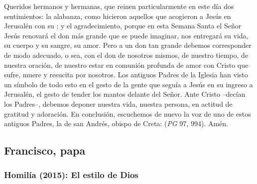 \begin{body}
Queridos hermanos y hermanas, que reinen particularmente en este día dos sentimientos: la alabanza, como hicieron aquellos que acogieron a Jesús en Jerusalén con su ; y el agradecimiento, porque en esta Semana Santa el Señor Jesús renovará el don más grande que se puede imaginar, nos entregará su vida, su cuerpo y su sangre, su amor. Pero a un don tan grande debemos corresponder de modo adecuado, o sea, con el don de nosotros mismos, de nuestro tiempo, de nuestra oración, de nuestro estar en comunión profunda de amor con Cristo que sufre, muere y resucita por nosotros. Los antiguos Padres de la Iglesia han visto un símbolo de todo esto en el gesto de la gente que seguía a Jesús en su ingreso a Jerusalén, el gesto de tender los mantos delante del Señor. Ante Cristo –decían los Padres–, debemos deponer nuestra vida, nuestra persona, en actitud de gratitud y adoración. En conclusión, escuchemos de nuevo la voz de uno de estos antiguos Padres, la de san Andrés, obispo de Creta:  (\textit{PG} 97, 994). Amén.
\end{body}


\newsection
\subsection{Francisco, papa}

\subsubsection{Homilía (2015): El estilo de Dios}


